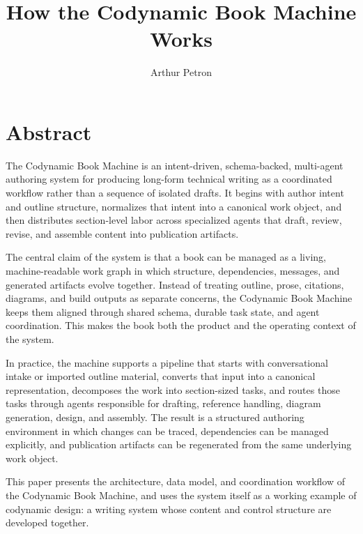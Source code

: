 \documentclass[11pt]{article}
\title{How the Codynamic Book Machine Works}
\author{Arthur Petron}
\begin{document}
\section*{Abstract}

The Codynamic Book Machine is an intent-driven, schema-backed, multi-agent authoring system for producing long-form technical writing as a coordinated workflow rather than a sequence of isolated drafts. It begins with author intent and outline structure, normalizes that intent into a canonical work object, and then distributes section-level labor across specialized agents that draft, review, revise, and assemble content into publication artifacts.

The central claim of the system is that a book can be managed as a living, machine-readable work graph in which structure, dependencies, messages, and generated artifacts evolve together. Instead of treating outline, prose, citations, diagrams, and build outputs as separate concerns, the Codynamic Book Machine keeps them aligned through shared schema, durable task state, and agent coordination. This makes the book both the product and the operating context of the system.

In practice, the machine supports a pipeline that starts with conversational intake or imported outline material, converts that input into a canonical representation, decomposes the work into section-sized tasks, and routes those tasks through agents responsible for drafting, reference handling, diagram generation, design, and assembly. The result is a structured authoring environment in which changes can be traced, dependencies can be managed explicitly, and publication artifacts can be regenerated from the same underlying work object.

This paper presents the architecture, data model, and coordination workflow of the Codynamic Book Machine, and uses the system itself as a working example of codynamic design: a writing system whose content and control structure are developed together.
\end{document}
